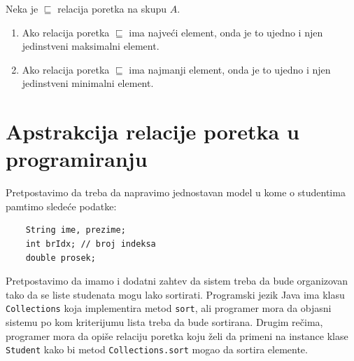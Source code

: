 \begin{THM}
  Neka je $\sqsubseteq$ relacija poretka na skupu $A$.
  \begin{enumerate}
  \item
    Ako relacija poretka $\sqsubseteq$ ima najve\'ci element, onda je to ujedno i njen jedinstveni maksimalni element.
  \item
    Ako relacija poretka $\sqsubseteq$ ima najmanji element, onda je to ujedno i njen jedinstveni minimalni element.
  \end{enumerate}
\end{THM}


\section{Apstrakcija relacije poretka u programiranju}

Pretpostavimo da treba da napravimo jednostavan model u kome o studentima pamtimo slede\'ce podatke:
{\small
\begin{verbatim}
    String ime, prezime;
    int brIdx; // broj indeksa
    double prosek;
\end{verbatim}
}
Pretpostavimo da imamo i dodatni zahtev da sistem treba da bude organizovan tako da se liste studenata mogu
lako sortirati. Programski jezik Java ima
klasu \verb`Collections` koja implementira metod \verb`sort`, ali programer mora da objasni sistemu
po kom kriterijumu lista treba da bude sortirana. Drugim re\v cima, programer mora da opi\v se relaciju poretka
koju \v zeli da primeni na instance klase \verb`Student` kako bi metod \verb`Collections.sort` mogao
da sortira elemente.

